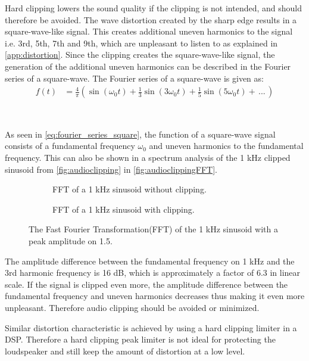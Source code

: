Hard clipping lowers the sound quality if the clipping is not intended, and should therefore be avoided. The wave distortion created by the sharp edge results in a square-wave-like signal. This creates additional uneven harmonics to the signal i.e. 3rd, 5th, 7th and 9th, which are unpleasant to listen to as explained in \autoref{app:distortion}. Since the clipping creates the square-wave-like signal, the generation of the additional uneven harmonics can be described in the Fourier series of a square-wave. The Fourier series of a square-wave is given as:
\begin{align}\label{eq:fourier_series_square}
f(t) &= \frac{4}{\pi} (\sin(\omega_0 t) + \frac{1}{3}\sin(3 \omega_0 t) + \frac{1}{5}\sin(5 \omega_0 t) + \, ... \,)
\end{align}
\begin{where}
\\
\end{where}

As seen in \autoref{eq:fourier_series_square}, the function of a square-wave signal consists of a fundamental frequency $\omega_0$ and uneven harmonics to the fundamental frequency. This can also be shown in a spectrum analysis of the 1 kHz clipped sinusoid from \autoref{fig:audioclipping} in \autoref{fig:audioclippingFFT}.

\begin{figure}[H]
\centering
\begin{subfigure}[t]{0.47\textwidth}
	
	\caption{FFT of a 1 kHz sinusoid without clipping.}
	\label{fig:clippingCleanFFT}
\end{subfigure}
\hspace{6mm} 
\begin{subfigure}[t]{0.47\textwidth}
	
	\caption{FFT of a 1 kHz sinusoid with clipping.}
	\label{fig:clippingDistFFT}
\end{subfigure}
\caption{The Fast Fourier Transformation(FFT) of the 1 kHz sinusoid with a peak amplitude on 1.5. }
\label{fig:audioclippingFFT}
\end{figure}
The amplitude difference between the fundamental frequency on 1 kHz and the 3rd harmonic frequency is 16 dB, which is approximately a factor of 6.3 in linear scale. If the signal is clipped even more, the amplitude difference between the fundamental frequency and uneven harmonics decreases thus making it even more unpleasant. Therefore audio clipping should be avoided or minimized.

Similar distortion characteristic is achieved by using a hard clipping limiter in a DSP. Therefore a hard clipping peak limiter is not ideal for protecting the loudspeaker and still keep the amount of distortion at a low level.









